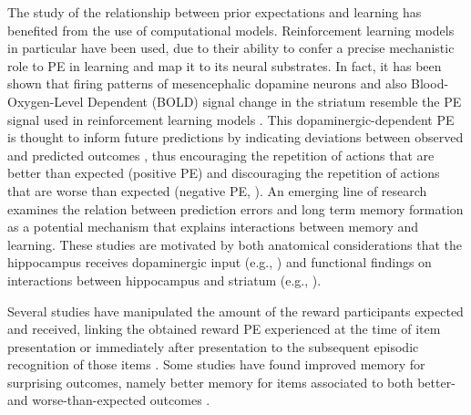 \documentclass[a4paper,12pt]{article}
\begin{document}
The study of the relationship between prior expectations and learning has benefited from the use of computational models. Reinforcement learning models in particular have been used, due to their ability to confer a precise mechanistic role to PE in learning and map it to its neural substrates. In fact, it has been shown that firing patterns of mesencephalic dopamine neurons and also Blood-Oxygen-Level Dependent (BOLD) signal change in the striatum resemble the PE signal used in reinforcement learning models \citep{Daw2011, McClure2003, Schultz1997}. This dopaminergic-dependent PE is thought to inform future predictions by indicating deviations between observed and predicted outcomes \citep{Daw2013, Niv2008, Rangel2008a, Rushworth2008}, thus encouraging the repetition of actions that are better than expected (positive PE) and discouraging the repetition of actions that are worse than expected (negative PE, \citealp{Schultz2016, Steinberg2013}). An emerging line of research examines the relation between prediction errors and long term memory formation as a potential mechanism that explains interactions between memory and learning. These studies are motivated by both anatomical considerations that the hippocampus receives dopaminergic input (e.g., \citealp{Lisman2005}) and functional findings on interactions between hippocampus and striatum (e.g., \citealp{Poldrack2001}). \par
Several studies have manipulated the amount of the reward participants expected and received, linking the obtained reward PE experienced at the time of item presentation or immediately after presentation to the subsequent episodic recognition of those items \citep{Rouhani2018,Rouhani2021, Jang2019, de2018signed}. Some studies have found improved memory for surprising outcomes, namely better memory for items associated to both better- and worse-than-expected outcomes \citep{Rouhani2018, Rouhani2021}.
\end{document}
